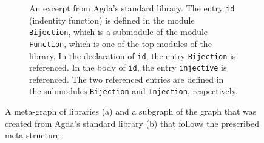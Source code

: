 \documentclass{article}
\begin{document}
\begin{figure}[b!]
\begin{subfigure}[b]{0.99\textwidth}
        \caption{An excerpt from Agda's standard library. The entry \texttt{id} (indentity function) is defined in the module \texttt{Bijection}, which is a submodule of the module \texttt{Function}, which is one of the top modules of the library. In the declaration of \texttt{id}, the entry \texttt{Bijection} is referenced. In the body of \texttt{id}, the entry \texttt{injective} is referenced. The two referenced entries are defined in the submodules \texttt{Bijection} and \texttt{Injection}, respectively.}
    \label{fig:stdlib-excerpt}
     \end{subfigure}
    \caption{A meta-graph of libraries (a) and a subgraph of the graph that was created from Agda's standard library (b) that follows the prescribed meta-structure.}
    \label{fig:library}
\end{figure} 
\end{document}

